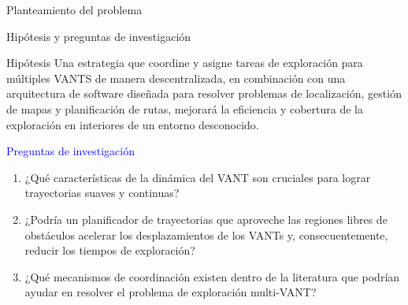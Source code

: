 \documentclass[
  24pt, %
  aspectratio=169, %
]{beamer}
\begin{document}
\begin{frame}{Planteamiento del problema}
  
\end{frame}

\begin{frame}{Hipótesis y preguntas de investigación}

  \begin{block}{Hipótesis}
    Una estrategia que coordine y asigne tareas de exploración para múltiples VANTS de manera descentralizada, en combinación con una arquitectura de software diseñada para resolver problemas de localización, gestión de mapas y planificación de rutas, mejorará la eficiencia y cobertura de la exploración en interiores de un entorno desconocido.
  \end{block}
  \textcolor{blue}{Preguntas de investigación}
  \begin{enumerate}
  \item ¿Qué características de la dinámica del VANT son cruciales para lograr trayectorias suaves y continuas?
  \item ¿Podría un planificador de trayectorias que aproveche las regiones libres de obstáculos acelerar los desplazamientos de los VANTs y, consecuentemente, reducir los tiempos de exploración?
  \item ¿Qué mecanismos de coordinación existen dentro de la literatura que podrían ayudar en resolver el problema de exploración multi-VANT?
  \end{enumerate}
\end{frame}
\end{document}
